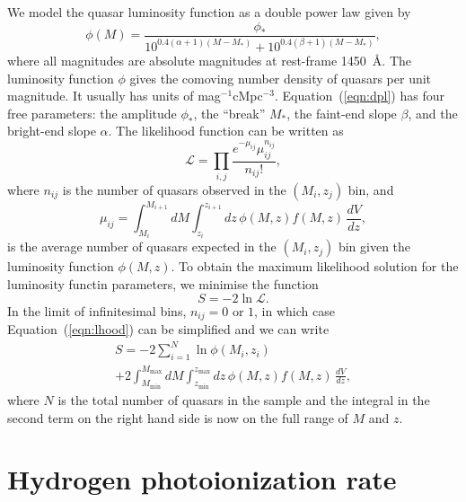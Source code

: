 \documentclass[a4paper,fleqn,usenatbib]{mnras}
\begin{document}
  We model the quasar luminosity function as a double power law given
  by \citep{1988MNRAS.235..935B, 1995ApJ...438..623P, 2000MNRAS.317.1014B}
  \begin{equation}
    \phi(M) = \frac{\phi_*}{10^{0.4(\alpha+1)(M-M_*)}+10^{0.4(\beta+1)(M-M_*)}},
\label{eqn:dpl}
\end{equation}
where all magnitudes are absolute magnitudes at rest-frame 1450~{\AA}.  
The luminosity function $\phi$ gives the comoving number density of
quasars per unit magnitude.  It usually has units of
mag$^{-1}$cMpc$^{-3}$.  Equation~(\ref{eqn:dpl}) has four free
parameters: the amplitude $\phi_*$, the ``break'' $M_*$, the faint-end
slope $\beta$, and the bright-end slope $\alpha$.  The likelihood
function can be written as \citep{2001AJ....121...54F}
\begin{equation}
  \mathcal{L}=\prod_{i,j}\frac{e^{-\mu_{ij}}\mu_{ij}^{n_{ij}}}{n_{ij}!},
  \label{eqn:lhood}
\end{equation}
where $n_{ij}$ is the number of quasars observed in the $(M_i, z_j)$
bin, and
\begin{equation}
  \mu_{ij}= \int_{M_i}^{M_{i+1}}dM\int_{z_i}^{z_{i+1}}dz\, \phi(M,z) f(M, z)\,\frac{dV}{dz},
\end{equation}
is the average number of quasars expected in the $(M_i, z_j)$ bin
given the luminosity function $\phi(M,z)$.  To obtain the maximum
likelihood solution for the luminosity functin parameters, we minimise
the function
\begin{equation}
  S = -2\ln\mathcal{L}.
\end{equation}
In the limit of infinitesimal bins, $n_{ij}=0$ or $1$, in which case
Equation~(\ref{eqn:lhood}) can be simplified and we can write \citep{1983ApJ...269...35M}
\begin{multline}
  S = -2\sum_{i=1}^N\ln\phi(M_i, z_i)\\+2\int_{M_\mathrm{min}}^{M_\mathrm{max}}dM\int_{z_\mathrm{min}}^{z_\mathrm{max}}dz\, \phi(M,z) f(M, z)\,\frac{dV}{dz},
\end{multline}
where $N$ is the total number of quasars in the sample and the
integral in the second term on the right hand side is now on the full
range of $M$ and $z$.

\section{Hydrogen photoionization rate}
\end{document}
